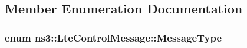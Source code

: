 \subsection{Member Enumeration Documentation}
\subsubsection[{\texorpdfstring{Message\+Type}{MessageType}}]{\setlength{\rightskip}{0pt plus 5cm}enum {\bf ns3\+::\+Lte\+Control\+Message\+::\+Message\+Type}}\hypertarget{classns3_1_1LteControlMessage_a9f9798d5aa8ad40f6432285b4b06135b}{}\label{classns3_1_1LteControlMessage_a9f9798d5aa8ad40f6432285b4b06135b}

